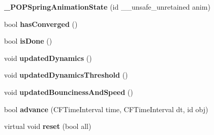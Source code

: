 \begin{DoxyCompactItemize}
{\bfseries \+\_\+\+P\+O\+P\+Spring\+Animation\+State} (id \+\_\+\+\_\+unsafe\+\_\+unretained anim)
\item 
\mbox{\label{struct___p_o_p_spring_animation_state_ab182ecfefc863b54017b4622530a459a}} 
bool {\bfseries has\+Converged} ()
\item 
\mbox{\label{struct___p_o_p_spring_animation_state_ac8292b4c3f19d2b3b9c55e81c226c475}} 
bool {\bfseries is\+Done} ()
\item 
\mbox{\label{struct___p_o_p_spring_animation_state_a2ec5c35f75240ef842914e16171977c0}} 
void {\bfseries updated\+Dynamics} ()
\item 
\mbox{\label{struct___p_o_p_spring_animation_state_a6f1e7b214f3099d63e44f7fa6be013e4}} 
void {\bfseries updated\+Dynamics\+Threshold} ()
\item 
\mbox{\label{struct___p_o_p_spring_animation_state_afb14f0207c42c4fb311b00fdc81fab1b}} 
void {\bfseries updated\+Bounciness\+And\+Speed} ()
\item 
\mbox{\label{struct___p_o_p_spring_animation_state_a3eefb1edc3d7a14a084ff3805f37f112}} 
bool {\bfseries advance} (C\+F\+Time\+Interval time, C\+F\+Time\+Interval dt, id obj)
\item 
\mbox{\label{struct___p_o_p_spring_animation_state_ac42ac070f25700ad6295540150fc6c75}} 
virtual void {\bfseries reset} (bool all)
\end{DoxyCompactItemize}
